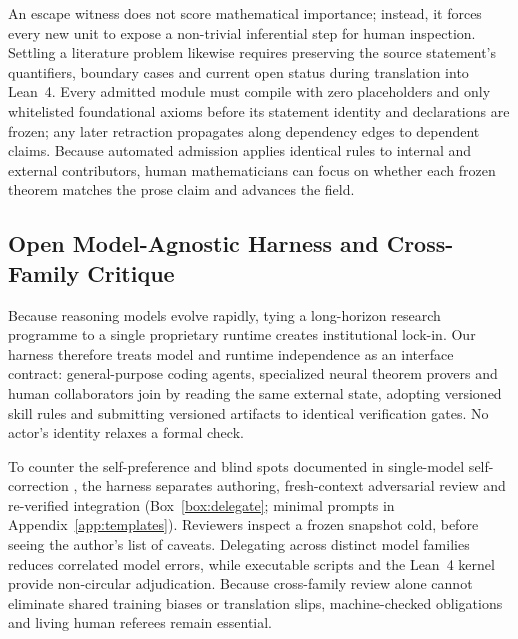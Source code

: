 \documentclass[11pt,a4paper]{article}
\newcommand{\code}[1]{\texttt{\detokenize{#1}}}
\begin{document}
An escape witness does not score mathematical importance; instead, it forces
every new unit to expose a non-trivial inferential step for human inspection.
Settling a literature problem likewise requires preserving the source
statement's quantifiers, boundary cases and current open status during
translation into Lean~4. Every admitted module must compile with zero
\code{sorry} placeholders and only whitelisted foundational axioms before its
statement identity and declarations are frozen; any later retraction propagates
along dependency edges to dependent claims. Because automated admission applies
identical rules to internal and external contributors, human mathematicians can
focus on whether each frozen theorem matches the prose claim and advances the
field.

\subsection{Open Model-Agnostic Harness and Cross-Family Critique}
\label{sec:harness}
Because reasoning models evolve rapidly, tying a long-horizon research
programme to a single proprietary runtime creates institutional lock-in. Our
harness therefore treats model and runtime independence as an interface
contract: general-purpose coding agents, specialized neural theorem provers and
human collaborators join by reading the same external state, adopting versioned
skill rules and submitting versioned artifacts to identical verification gates.
No actor's identity relaxes a formal check.

To counter the self-preference and blind spots documented in single-model
self-correction \citep{huang,panickssery,zheng2023judge}, the harness separates
authoring, fresh-context adversarial review and re-verified integration
(Box~\ref{box:delegate}; minimal prompts in Appendix~\ref{app:templates}).
Reviewers inspect a frozen snapshot cold, before seeing the author's list of
caveats. Delegating across distinct model families reduces correlated model
errors, while executable scripts and the Lean~4 kernel provide non-circular
adjudication. Because cross-family review alone cannot eliminate shared
training biases or translation slips, machine-checked obligations and living
human referees remain essential.
\end{document}

